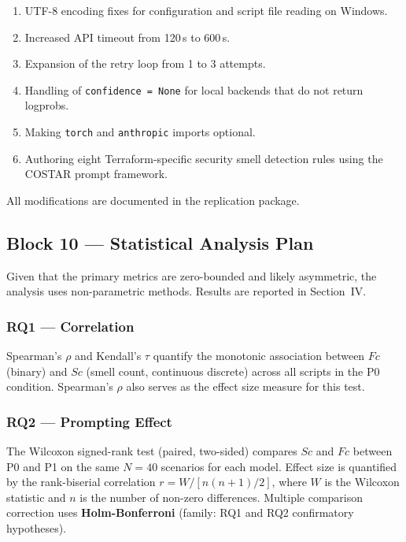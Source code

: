 \begin{enumerate}[leftmargin=*]
    \item UTF-8 encoding fixes for configuration and script file
          reading on Windows.
    \item Increased API timeout from 120\,s to 600\,s.
    \item Expansion of the retry loop from 1 to 3 attempts.
    \item Handling of \texttt{confidence = None} for local backends
          that do not return logprobs.
    \item Making \texttt{torch} and \texttt{anthropic} imports
          optional.
    \item Authoring eight Terraform-specific security smell detection
          rules using the COSTAR prompt framework.
\end{enumerate}

All modifications are documented in the replication package.

\subsection{Block 10 --- Statistical Analysis Plan}
\label{sec:block10}

Given that the primary metrics are zero-bounded and likely
asymmetric, the analysis uses non-parametric methods. Results are
reported in Section~IV.

\subsubsection{RQ1 --- Correlation}

Spearman's $\rho$ and Kendall's $\tau$ quantify the monotonic
association between $Fc$ (binary) and $Sc$ (smell count, continuous
discrete) across all scripts in the P0 condition. Spearman's $\rho$
also serves as the effect size measure for this test.

\subsubsection{RQ2 --- Prompting Effect}

The Wilcoxon signed-rank test (paired, two-sided) compares $Sc$
and $Fc$ between P0 and P1 on the same $N = 40$ scenarios for each
model. Effect size is quantified by the rank-biserial correlation
$r = W / [n(n+1)/2]$, where $W$ is the Wilcoxon statistic and $n$
is the number of non-zero differences. Multiple comparison correction
uses \textbf{Holm-Bonferroni} (family: RQ1 and RQ2 confirmatory
hypotheses).

